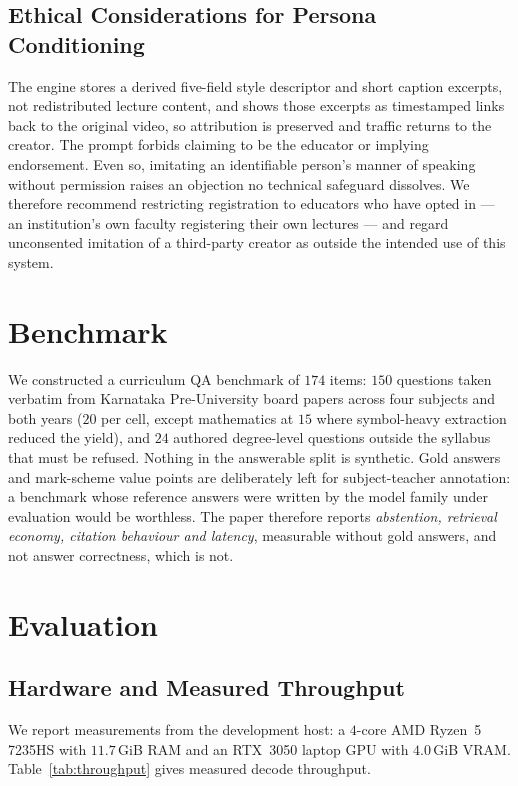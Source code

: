 \documentclass[conference]{IEEEtran}
\begin{document}
\subsection{Ethical Considerations for Persona Conditioning}
\label{sec:ethics}
The engine stores a derived five-field style descriptor and short caption
excerpts, not redistributed lecture content, and shows those excerpts as
timestamped links back to the original video, so attribution is preserved and
traffic returns to the creator. The prompt forbids claiming to be the educator
or implying endorsement. Even so, imitating an identifiable person's manner of
speaking without permission raises an objection no technical safeguard
dissolves. We therefore recommend restricting registration to educators who have
opted in --- an institution's own faculty registering their own lectures --- and
regard unconsented imitation of a third-party creator as outside the intended
use of this system.

\section{Benchmark}
We constructed a curriculum QA benchmark of $174$ items: $150$ questions taken
verbatim from Karnataka Pre-University board papers across four subjects and
both years ($20$ per cell, except mathematics at $15$ where symbol-heavy
extraction reduced the yield), and $24$ authored degree-level questions outside
the syllabus that must be refused. Nothing in the answerable split is synthetic.
Gold answers and mark-scheme value points are deliberately left for
subject-teacher annotation: a benchmark whose reference answers were written by
the model family under evaluation would be worthless. The paper therefore
reports \emph{abstention, retrieval economy, citation behaviour and latency},
measurable without gold answers, and not answer correctness, which is not.

\section{Evaluation}
\subsection{Hardware and Measured Throughput}
\label{sec:latency}
We report measurements from the development host: a $4$-core AMD Ryzen~5 7235HS
with $11.7$\,GiB RAM and an RTX~3050 laptop GPU with $4.0$\,GiB VRAM.
Table~\ref{tab:throughput} gives measured decode throughput.
\end{document}
